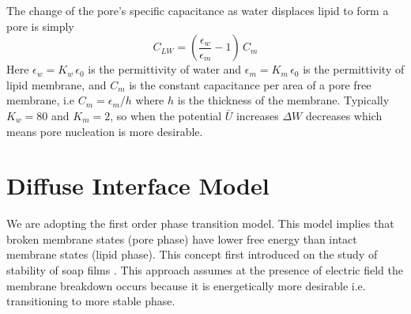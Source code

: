 \documentclass[english,12pt]{article}
\begin{document}
The change of the pore's specific capacitance as water displaces lipid to form a pore is simply 
\begin{equation}
C_{LW}=\left(\frac{\epsilon_w}{\epsilon_m}-1\right)\,C_m
\end{equation}
Here $\epsilon_w=K_w\,\epsilon_0$ is the permittivity of water and $\epsilon_m=K_m\,\epsilon_0$ is the permittivity of lipid membrane, and $C_m$ is the constant capacitance per area of a pore free membrane, i.e $C_m=\epsilon_m/h$ where $h$ is the thickness of the membrane. Typically $K_w=80$ and $K_m=2$, so when the potential $\bar{U}$ increases $\Delta W$ decreases which means pore nucleation is more desirable.

\section{Diffuse Interface Model}
We are adopting the first order phase transition model. This model implies that broken membrane states (pore phase) have lower free energy than intact membrane states (lipid phase). This concept first introduced on the study of stability of soap films \cite{deryagin1962theory, derjaguin1981theory}. This approach assumes at the presence of electric field the membrane breakdown occurs because it is energetically more desirable i.e. transitioning to more stable phase.
\end{document}
